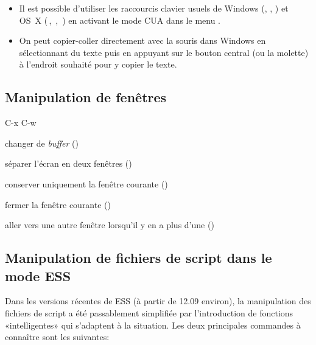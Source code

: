 \begin{itemize}
\item Il est possible d'utiliser les raccourcis clavier usuels de
  Windows (, , ) et OS~X
  (\cmdkey\,, \cmdkey\,, \cmdkey\,) en
  activant le mode CUA dans le menu .
\item On peut copier-coller directement avec la souris dans Windows en
  sélectionnant du texte puis en appuyant sur le bouton central (ou la
  molette) à l'endroit souhaité pour y copier le texte.
\end{itemize}


\subsection{Manipulation de fenêtres}
\label{emacs+ess:commandes:fenetres}

\begin{ttscript}{C-x C-w}
\item[\emacs{C-x b}] changer de \emph{buffer}
  ()
\item[\emacs{C-x 2}] séparer l'écran en deux fenêtres
  ()
\item[\emacs{C-x 1}] conserver uniquement la fenêtre courante
  ()
\item[\emacs{C-x 0}] fermer la fenêtre courante
  ()
\item[\emacs{C-x o}] aller vers une autre fenêtre lorsqu'il y en a
  plus d'une ()
\end{ttscript}

\subsection{Manipulation de fichiers de script dans le mode ESS}
\label{emacs+ess:commandes:script}

Dans les versions récentes de ESS (à partir de 12.09 environ), la
manipulation des fichiers de script a été passablement simplifiée par
l'introduction de fonctions «intelligentes» qui s'adaptent à la
situation. Les deux principales commandes à connaître sont les
suivantes:

